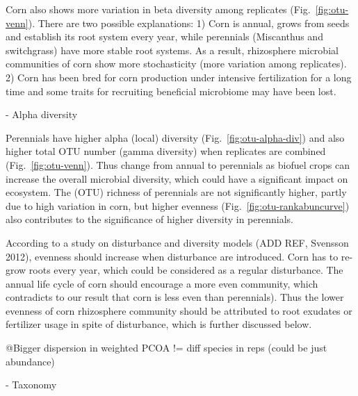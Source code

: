 \documentclass[12pt]{article}
\begin{document}
Corn also shows more variation in beta diversity among replicates (Fig.~\ref{fig:otu-venn}). There are two possible explanations: 1) Corn is annual, grows from seeds and establish its root system every year, while perennials (Miscanthus and switchgrass) have more stable root systems. As a result, rhizosphere microbial communities of corn show more stochasticity (more variation among replicates). 2) Corn has been bred for corn production under intensive fertilization for a long time and some traits for recruiting beneficial microbiome may have been lost.

- Alpha diversity

Perennials have higher alpha (local) diversity (Fig.~\ref{fig:otu-alpha-div}) and also higher total OTU number (gamma diversity) when replicates are combined (Fig.~\ref{fig:otu-venn}). Thus change from annual to perennials as biofuel crops can increase the overall microbial diversity, which could have a significant impact on ecosystem. The (OTU) richness of perennials are not significantly higher, partly due to high variation in corn, but higher evenness (Fig.~\ref{fig:otu-rankabuncurve}) also contributes to the significance of higher diversity in perennials. 

According to a study on disturbance and diversity models (ADD REF, Svensson 2012), evenness should increase when disturbance are introduced. Corn has to re-grow roots every year, which could be considered as a regular disturbance. The annual life cycle of corn should encourage a more even community, which contradicts to our result that corn is less even than perennials). Thus the lower evenness of corn rhizosphere community should be attributed to root exudates or fertilizer usage in spite of disturbance, which is further discussed below.

@Bigger dispersion in weighted PCOA != diff species in reps (could be just abundance)

- Taxonomy
\end{document}
